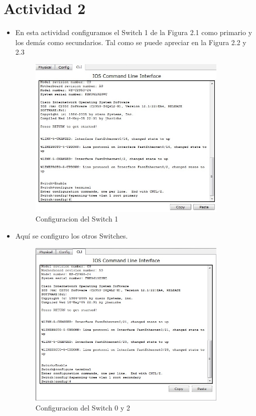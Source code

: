 \documentclass[spanish]{udpreport}
\begin{document}
\section{Actividad 2}
\begin{itemize}
\item En esta actividad configuramos el Switch 1 de la Figura 2.1 como primario y los demás como secundarios. Tal como se puede apreciar en la Figura 2.2 y 2.3

\vspace{1 cm}
\begin{figure}[h!]
	\centering
	\includegraphics[width=0.90\textwidth]{./imagenes/red2}
	\caption{Configuracion del Switch 1} 
\end{figure}
\vspace{7 cm}
\item Aquí se configuro los otros Switches.\\
\begin{figure}[h!]
	\centering
	\includegraphics[width=0.90\textwidth]{./imagenes/redes3}
	\caption{Configuracion del Switch 0 y 2} 
\end{figure}
\end{itemize}
\vspace{8 cm}
\end{document}
